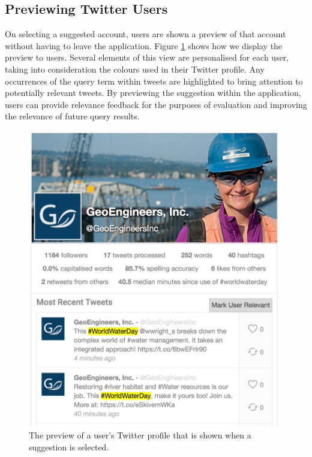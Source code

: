 \documentclass{l4proj}
\begin{document}
        \subsection{Previewing Twitter Users}
        On selecting a suggested account, users are shown a preview of that account without having to leave the application. Figure \ref{userpreview} shows how we display the preview to users. Several elements of this view are personalised for each user, taking into consideration the colours used in their Twitter profile. Any occurrences of the query term within tweets are highlighted to bring attention to potentially relevant tweets. By previewing the suggestion within the application, users can provide relevance feedback for the purposes of evaluation and improving the relevance of future query results.
        
\begin{figure}
\centering
\includegraphics[scale=0.5]{userpreview.png}
\caption{The preview of a user's Twitter profile that is shown when a suggestion is selected.}
\label{userpreview}
\end{figure}         
        
\end{document}
